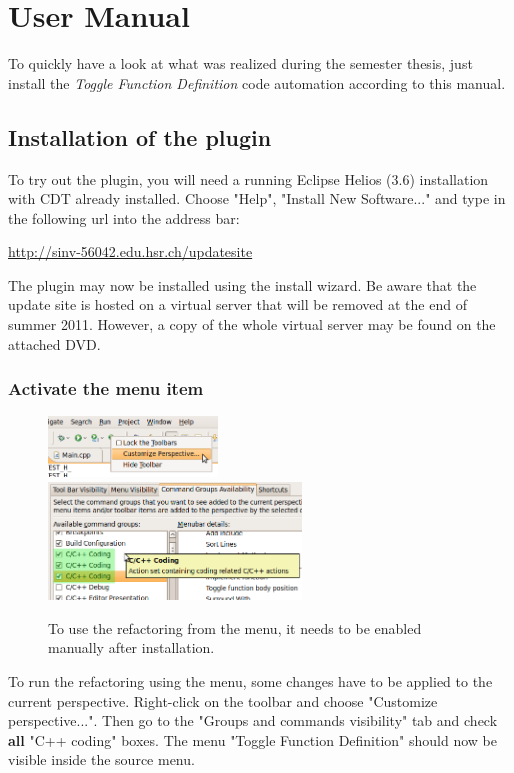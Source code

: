 \chapter{User Manual}
\thispagestyle{fancy}

To quickly have a look at what was realized during the semester thesis, just 
install the \textit{Toggle Function Definition} code automation according to 
this manual.

\section{Installation of the plugin}

To try out the plugin, you will need a running Eclipse Helios (3.6) installation with CDT already installed. Choose "Help", "Install New Software..." and type in the following url into the address bar:

\url{http://sinv-56042.edu.hsr.ch/updatesite}

The plugin may now be installed using the install wizard. Be aware that the 
update site is hosted on a virtual server that will be removed at the end of 
summer 2011. However, a copy of the whole virtual server may be found on the 
attached DVD.

\subsection{Activate the menu item}

\begin{figure}[h]
\includegraphics[width=0.4\textwidth]{images/customizeperspective.png}
\includegraphics[width=0.6\textwidth]{images/commandgroups.png}
\caption{To use the refactoring from the menu, it needs to be enabled manually 
after installation.}
\label{showMenu}
\end{figure}
\label{cmdGroup}
To run the refactoring using the menu, some changes have to be applied to the 
current perspective. Right-click on the toolbar and choose 
"Customize perspective...". Then go to the "Groups and commands visibility" tab 
and check \textbf{all} "C++ coding" boxes. The menu "Toggle Function Definition" 
should now be visible inside the source menu.

